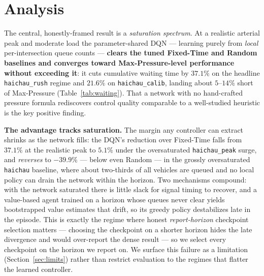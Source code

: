 \section{Analysis}
\label{sec:analysis}

The central, honestly-framed result is a \emph{saturation spectrum}. At a realistic arterial
peak and moderate load the parameter-shared DQN --- learning purely from \emph{local}
per-intersection queue counts --- \textbf{clears the tuned Fixed-Time and Random baselines and
converges toward Max-Pressure-level performance without exceeding it}: it cuts cumulative
waiting time by $37.1\%$ on the headline \texttt{haichau\_rush} regime and $21.6\%$ on
\texttt{haichau\_calib}, landing about $5$--$14\%$ short of Max-Pressure
(Table~\ref{tab:waiting}). That a network with no hand-crafted pressure formula rediscovers
control quality comparable to a well-studied heuristic is the key positive finding.

\textbf{The advantage tracks saturation.} The margin any controller can extract shrinks as the
network fills: the DQN's reduction over Fixed-Time falls from $37.1\%$ at the realistic peak to
$5.1\%$ under the oversaturated \texttt{haichau\_peak} surge, and \emph{reverses} to $-39.9\%$
--- below even Random --- in the grossly oversaturated \texttt{haichau} baseline, where about
two-thirds of all vehicles are queued and no local policy can drain the network within the
horizon. Two mechanisms compound: with the network saturated there is little slack for signal
timing to recover, and a value-based agent trained on a horizon whose queues never clear yields
bootstrapped value estimates that drift, so its greedy policy destabilizes late in the episode.
This is exactly the regime where honest \emph{report-horizon} checkpoint selection matters ---
choosing the checkpoint on a shorter horizon hides the late divergence and would over-report the
dense result --- so we select every checkpoint on the horizon we report on. We surface this
failure as a limitation (Section~\ref{sec:limits}) rather than restrict evaluation to the
regimes that flatter the learned controller.

